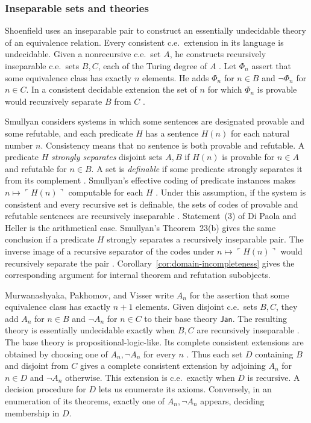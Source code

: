 \subsubsection{Inseparable sets and theories}

Shoenfield uses an inseparable pair to construct an essentially
undecidable theory of an equivalence relation. Every consistent
c.e.\ extension in its language is undecidable. Given a nonrecursive
c.e.\ set $A$, he constructs
recursively inseparable c.e.\ sets $B,C$, each of the Turing degree of $A$
\cite[Theorem~1, p.~389]{Shoenfield}. Let $\Phi_n$ assert that some
equivalence class has exactly $n$ elements. He adds $\Phi_n$ for $n\in B$
and $\neg\Phi_n$ for $n\in C$. In a
consistent decidable extension the set of $n$ for which $\Phi_n$ is
provable would recursively separate $B$ from $C$
\cite[Theorem~2, pp.~390--391]{Shoenfield}.

Smullyan considers systems in which some sentences are designated
provable and some refutable, and each predicate $H$ has a sentence
$H(n)$ for each natural number $n$. Consistency means that no sentence
is both provable and refutable. A predicate $H$ \emph{strongly separates}
disjoint sets $A,B$ if $H(n)$ is provable for $n\in A$ and refutable
for $n\in B$. A set is \emph{definable} if some predicate strongly
separates it from its complement \cite[Chapter~III, \S5, p.~48]{Smullyan}.
Smullyan's effective coding of predicate instances makes
$n\mapsto\ulcorner H(n)\urcorner$ computable for each $H$
\cite[Chapter~III, \S8, p.~52]{Smullyan}. Under this assumption, if the
system is consistent and every recursive set
is definable, the sets of codes of provable and refutable sentences
are recursively inseparable \cite[Chapter~III, \S16, Theorem~22, p.~59]{Smullyan}.
Statement~(3) of Di Paola and Heller \cite[pp.~594--596]{DPH} is the
arithmetical case. Smullyan's Theorem~23(b) gives the same conclusion
if a predicate $H$ strongly separates a recursively inseparable pair.
The inverse image of a recursive separator of the codes under
$n\mapsto\ulcorner H(n)\urcorner$ would recursively separate the pair
\cite[Chapter~III, \S17, pp.~59--60]{Smullyan}. Corollary~\ref{cor:domain-incompleteness}
gives the corresponding argument for internal theorem and refutation
subobjects.

Murwanashyaka, Pakhomov, and Visser write $A_n$ for the assertion that
some equivalence class has exactly $n+1$ elements. Given disjoint
c.e.\ sets $B,C$, they add $A_n$ for $n\in B$ and $\neg A_n$ for
$n\in C$ to their base theory $\mathsf{Jan}$. The resulting theory is essentially
undecidable exactly when $B,C$ are recursively inseparable
\cite[Section~4.4, p.~1169]{MPV}.
The base theory is propositional-logic-like. Its complete consistent
extensions are obtained by choosing one of $A_n,\neg A_n$ for every $n$
\cite[Section~4.1 and Theorem~4.3, pp.~1163--1164]{MPV}.
Thus each set $D$ containing $B$ and disjoint from $C$ gives a complete consistent
extension by adjoining $A_n$ for $n\in D$ and $\neg A_n$ otherwise.
This extension is c.e.\ exactly when $D$ is recursive. A decision
procedure for $D$ lets us enumerate its axioms. Conversely, in an
enumeration of its theorems, exactly one of $A_n,\neg A_n$ appears,
deciding membership in $D$.

